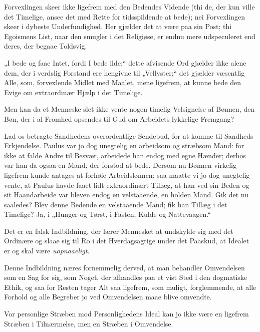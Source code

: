 \documentclass[12pt,a4paper]{book}
\newcommand{\apage}[1]{\marginnote{\footnotesize\textit{[#1]}}}
\begin{document}
Forvexlingen skeer ikke ligefrem med den Bedendes Vidende (thi
de, der kun ville det Timelige, ansee det med Rette for
tidsspildende at bede); nei Forvexlingen skeer i dybeste
Underfundighed. Her gjælder det at være paa sin Post; thi
Egoismens List, naar den smugler i det Religiøse, er endnu mere
udspeculeret end deres, der begaae Toldsvig.

„I bede og faae Intet, fordi I bede ilde;“ dette afvisende Ord
gjælder ikke alene dem, der i verdslig Forstand ere hengivne til
„Vellyster;“ det gjælder væsentlig Alle, som, forvexlende Midlet
med Maalet, mene ligefrem, at kunne bede den Evige om
extraordinær Hjælp i det Timelige.

Men kan da et Menneske slet ikke vente nogen timelig Velsignelse
af Bønnen, den Bøn, der i al Fromhed opsendes til Gud om
Arbeidets lykkelige Fremgang?

Lad os betragte Sandhedens overordentlige Sendebud, for at komme
til Sandheds Erkjendelse. Paulus var jo dog unegtelig en arbeidsom
og stræbsom Mand: for ikke at falde Andre til Besvær, arbeidede
han endog med egne Hænder; derhos var han da ogsaa en Mand, der
forstod at bede. Dersom nu Bønnen virkelig ligefrem kunde antages
at forhøie Arbeidslønnen: saa maatte vi jo dog unegtelig vente, at
Paulus havde faaet lidt extraordinært Tillæg, at han ved sin Beden
og sit Haandarbeide var bleven endog en velstaaende, en holden
Mand. Gik det nu saaledes? Blev denne Bedende en velstaaende
Mand; fik han Tillæg i det Timelige? Ja, i „Hunger og Tørst, i
Fasten, Kulde og Nattevaagen.“

Det er en falsk Indbildning, der lærer Mennesket at undskylde sig
med det Ordinære og slaae sig til Ro i det Hverdagsagtige under det
Paaskud, at Idealet er og skal være \emph{uopnaaeligt}.

\apage{139} Denne Indbildning næres fornemmelig derved, at man behandler
Omvendelsen som en Sag for sig, som Noget, der afhandles paa et
vist Sted i den dogmatiske Ethik, og saa for Resten tager Alt saa
ligefrem, som muligt, forglemmende, at alle Forhold og alle
Begreber jo ved Omvendelsen maae blive omvendte.

Vor personlige Stræben mod Personlighedens Ideal kan jo ikke være
en ligefrem Stræben i Tilnærmelse, men en Stræben i Omvendelse.
\end{document}
